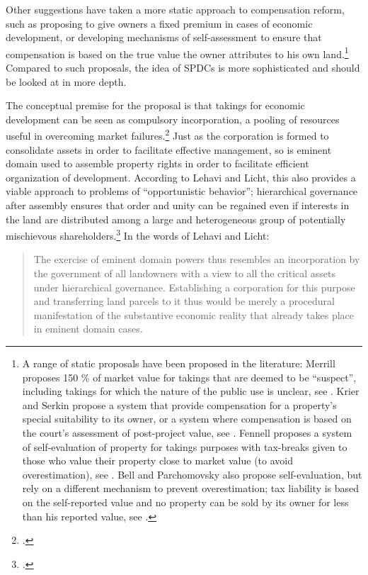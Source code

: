 Other suggestions have taken a more static approach to compensation reform, such as proposing to give owners a fixed premium in cases of economic development, or developing mechanisms of self-assessment to ensure that compensation is based on the true value the owner attributes to his own land.\footnote{A range of static proposals have been proposed in the literature: Merrill proposes 150 \% of market value for takings that are deemed to be ``suspect'', including takings for which the nature of the public use is unclear, see \cite[90-93]{merrill86}. Krier and Serkin propose a system that provide compensation for a property's special suitability to its owner, or a system where compensation is based on the court's assessment of post-project value, see \cite[865-873]{krier04}. Fennell proposes a system of self-evaluation of property for takings purposes with tax-breaks given to those who value their property close to market value (to avoid overestimation), see \cite[995-996]{fennell04}. Bell and Parchomovsky also propose self-evaluation, but rely on a different mechanism to prevent overestimation; tax liability is based on the self-reported value and no property can be sold by its owner for less than his reported value, see \cite[890-900]{bell07}.} Compared to such proposals, the idea of SPDCs is more sophisticated and should be looked at in more depth. 

The conceptual premise for the proposal is that takings for economic development can be seen as compulsory incorporation, a pooling of resources useful in overcoming market failures.\footcite[1732-1733]{lehavi07} Just as the corporation is formed to consolidate assets in order to facilitate effective management, so is eminent domain used to assemble property rights in order to facilitate efficient organization of development. According to Lehavi and Licht, this also provides a viable approach to problems of ``opportunistic behavior''; hierarchical governance after assembly ensures that order and unity can be regained even if interests in the land are distributed among a large and heterogeneous group of potentially mischievous shareholders.\footcite[1733]{lehavi07} In the words of Lehavi and Licht:

\begin{quote}
The exercise of eminent domain powers thus resembles an incorporation by the government of all landowners with a view to  all the critical assets under hierarchical governance. Establishing a corporation for this purpose and transferring land parcels to it thus would be merely a procedural manifestation of the substantive economic reality that already takes place in eminent domain cases.
\end{quote}

